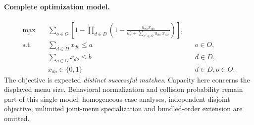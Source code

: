 \documentclass[11pt]{article}
\begin{document}
\paragraph{Complete optimization model.}
\begin{align}
\max_{x}\quad &\sum_{o\in O}\left[
1-\prod_{d\in D}\left(1-
\frac{u_{do}x_{do}}{u_d^c+\sum_{o'\in O}u_{do'}x_{do'}}\right)\right],\tag{5/12}\\
\text{s.t.}\quad &\sum_{d\in D}x_{do}\le a &&o\in O,\tag{6}\\
&\sum_{o\in O}x_{do}\le b &&d\in D,\tag{7}\\
&x_{do}\in\{0,1\} &&d\in D,o\in O.\tag{D}
\end{align}
The objective is expected \emph{distinct successful matches}. Capacity here concerns
the displayed menu size.
Behavioral normalization and collision probability remain part of this
single model; homogeneous-case analyses, independent disjoint objective,
unlimited joint-menu specialization and bundled-order extension are omitted.
\end{document}
